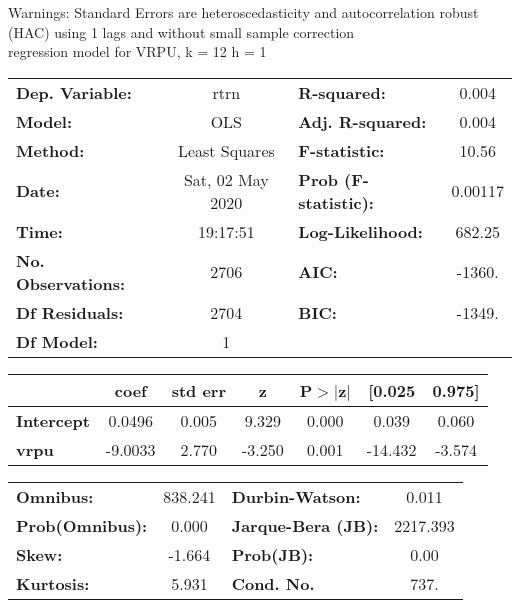 Warnings: \newline
 [1] Standard Errors are heteroscedasticity and autocorrelation robust (HAC) using 1 lags and without small sample correction\\ 

regression model for VRPU, k = 12 h = 1\begin{center}
\begin{tabular}{lclc}
\toprule
\textbf{Dep. Variable:}    &       rtrn       & \textbf{  R-squared:         } &     0.004   \\
\textbf{Model:}            &       OLS        & \textbf{  Adj. R-squared:    } &     0.004   \\
\textbf{Method:}           &  Least Squares   & \textbf{  F-statistic:       } &     10.56   \\
\textbf{Date:}             & Sat, 02 May 2020 & \textbf{  Prob (F-statistic):} &  0.00117    \\
\textbf{Time:}             &     19:17:51     & \textbf{  Log-Likelihood:    } &    682.25   \\
\textbf{No. Observations:} &        2706      & \textbf{  AIC:               } &    -1360.   \\
\textbf{Df Residuals:}     &        2704      & \textbf{  BIC:               } &    -1349.   \\
\textbf{Df Model:}         &           1      & \textbf{                     } &             \\
\bottomrule
\end{tabular}
\begin{tabular}{lcccccc}
                   & \textbf{coef} & \textbf{std err} & \textbf{z} & \textbf{P$> |$z$|$} & \textbf{[0.025} & \textbf{0.975]}  \\
\midrule
\textbf{Intercept} &       0.0496  &        0.005     &     9.329  &         0.000        &        0.039    &        0.060     \\
\textbf{vrpu}      &      -9.0033  &        2.770     &    -3.250  &         0.001        &      -14.432    &       -3.574     \\
\bottomrule
\end{tabular}
\begin{tabular}{lclc}
\textbf{Omnibus:}       & 838.241 & \textbf{  Durbin-Watson:     } &    0.011  \\
\textbf{Prob(Omnibus):} &   0.000 & \textbf{  Jarque-Bera (JB):  } & 2217.393  \\
\textbf{Skew:}          &  -1.664 & \textbf{  Prob(JB):          } &     0.00  \\
\textbf{Kurtosis:}      &   5.931 & \textbf{  Cond. No.          } &     737.  \\
\bottomrule
\end{tabular}
\end{center}

